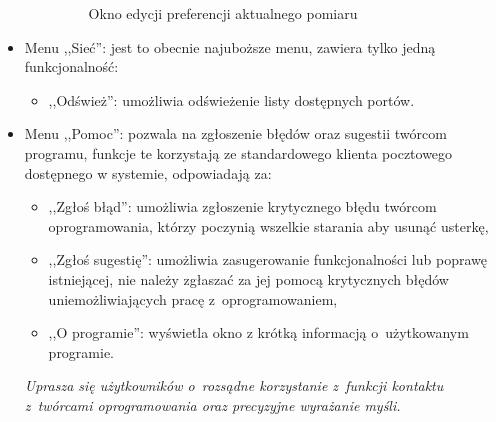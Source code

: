 \begin{itemize}
\begin{itemize}
\begin{figure}[!htb]
\centering 		
  \hspace{2mm}
\caption{Okno edycji preferencji aktualnego pomiaru} 	
\label{editSurvey}
\end{figure}

\end{itemize}
\item Menu ,,Sieć'': jest to obecnie najuboższe menu, zawiera tylko jedną funkcjonalność:
\begin{itemize}
\item ,,Odśwież'': umożliwia odświeżenie listy dostępnych portów.
\end{itemize}
\item Menu ,,Pomoc'': pozwala na zgłoszenie błędów oraz sugestii twórcom programu, funkcje te korzystają ze standardowego klienta pocztowego dostępnego w systemie, odpowiadają za:
\begin{itemize}
\item ,,Zgłoś błąd'': umożliwia zgłoszenie krytycznego błędu twórcom oprogramowania, którzy poczynią wszelkie starania aby usunąć usterkę,
\item ,,Zgłoś sugestię'': umożliwia zasugerowanie funkcjonalności lub poprawę istniejącej, nie należy zgłaszać za jej pomocą krytycznych błędów uniemożliwiających pracę z~oprogramowaniem,
\item ,,O programie'': wyświetla okno z krótką informacją o~użytkowanym programie.
\end{itemize}
\textit{Uprasza się użytkowników o~rozsądne korzystanie z~funkcji kontaktu z~twórcami oprogramowania oraz precyzyjne wyrażanie myśli.}
\end{itemize}

